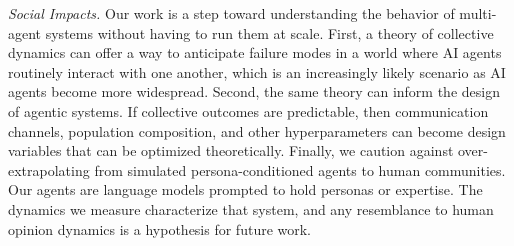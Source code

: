 \textit{Social Impacts.} Our work is a step toward understanding the behavior of multi-agent systems without having to run them at scale. First, a theory of collective dynamics can offer a way to anticipate failure modes in a world where AI agents routinely interact with one another, which is an increasingly likely scenario as AI agents become more widespread. Second, the same theory can inform the design of agentic systems. If collective outcomes are predictable, then communication channels, population composition, and other hyperparameters can become design variables that can be optimized theoretically. Finally, we caution against over-extrapolating from simulated persona-conditioned agents to human communities. Our agents are language models prompted to hold personas or expertise. The dynamics we measure characterize that system, and any resemblance to human opinion dynamics is a hypothesis for future work.
